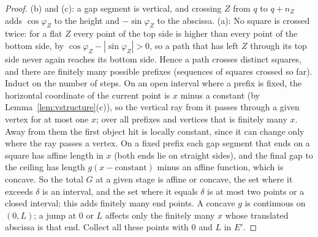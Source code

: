 \documentclass[11pt,letterpaper]{amsart}
\theoremstyle{plain}
\theoremstyle{definition}
\theoremstyle{remark}
\begin{document}
\begin{proof}
(b) and (c): a gap segment is vertical, and crossing $Z$ from $q$ to $q+n_Z$ adds $\cos\varphi_Z$ to the height and $-\sin\varphi_Z$ to the abscissa. (a): No square is crossed twice: for a flat $Z$ every point of the top side is higher than every point of the bottom side, by $\cos\varphi_Z-|\sin\varphi_Z|>0$, so a path that has left $Z$ through its top side never again reaches its bottom side. Hence a path crosses distinct squares, and there are finitely many possible prefixes (sequences of squares crossed so far). Induct on the number of steps. On an open interval where a prefix is fixed, the horizontal coordinate of the current point is $x$ minus a constant (by Lemma~\ref{lem:vstructure}(c)), so the vertical ray from it passes through a given vertex for at most one $x$; over all prefixes and vertices that is finitely many $x$. Away from them the first object hit is locally constant, since it can change only where the ray passes a vertex. On a fixed prefix each gap segment that ends on a square has affine length in $x$ (both ends lie on straight sides), and the final gap to the ceiling has length $g(x-\text{constant})$ minus an affine function, which is concave. So the total $G$ at a given stage is affine or concave, the set where it exceeds $\delta$ is an interval, and the set where it equals $\delta$ is at most two points or a closed interval; this adds finitely many end points. A concave $g$ is continuous on $(0,L)$; a jump at $0$ or $L$ affects only the finitely many $x$ whose translated abscissa is that end. Collect all these points with $0$ and $L$ in $E'$.


\end{proof}
\end{document}
